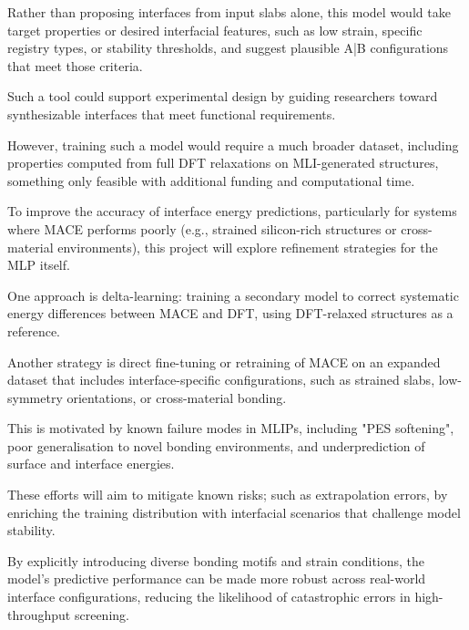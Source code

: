Rather than proposing interfaces from input slabs alone, this model would take target properties or desired interfacial
features, such as low strain, specific registry types, or stability thresholds, and suggest plausible A|B configurations
that meet those criteria\nocite{}.

\label{para:objectives_inverse_limitations} %

Such a tool could support experimental design by guiding researchers toward synthesizable interfaces that meet
functional requirements\nocite{}.

However, training such a model would require a much broader dataset, including properties computed from full DFT
relaxations on MLI-generated structures, something only feasible with additional funding and computational time\nocite{}.

\label{para:objectives_mlp_refinement} %

To improve the accuracy of interface energy predictions, particularly for systems where MACE performs poorly (e.g.,
strained silicon-rich structures or cross-material environments), this project will explore refinement strategies for
the MLP itself\nocite{}.

One approach is delta-learning: training a secondary model to correct systematic energy differences between MACE and
DFT, using DFT-relaxed structures as a reference. \cite{Pitfield2025-ah}

\label{para:objectives_mlp_tuning} %

Another strategy is direct fine-tuning or retraining of MACE on an expanded dataset that includes interface-specific
configurations, such as strained slabs, low-symmetry orientations, or cross-material bonding.

This is motivated by known failure modes in MLIPs, including "PES softening", poor generalisation to novel bonding
environments, and underprediction of surface and interface energies. \cite{}

These efforts will aim to mitigate known risks; such as extrapolation errors, by enriching the training distribution
with interfacial scenarios that challenge model stability.

By explicitly introducing diverse bonding motifs and strain conditions, the model's predictive performance can be made
more robust across real-world interface configurations, reducing the likelihood of catastrophic errors in
high-throughput screening\nocite{}.

